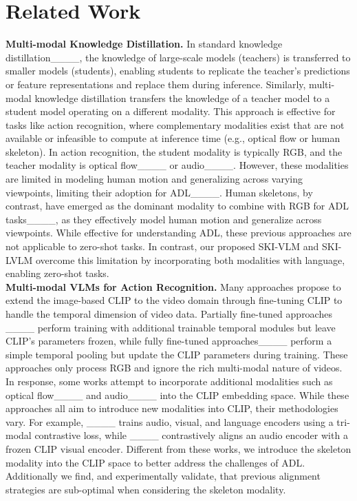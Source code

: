 \section{Related Work}
\noindent
\textbf{Multi-modal Knowledge Distillation.}
In standard knowledge distillation____, the knowledge of large-scale models (teachers) is transferred to smaller models (students), enabling students to replicate the teacher’s predictions or feature representations and replace them during inference. Similarly, multi-modal knowledge distillation transfers the knowledge of a teacher model to a student model operating on a different modality. This approach is effective for tasks like action recognition, where complementary modalities exist that are not available or infeasible to compute at inference time (e.g., optical flow or human skeleton). In action recognition, the student modality is typically RGB, and the teacher modality is optical flow____ or audio____. However, these modalities are limited in modeling human motion and generalizing across varying viewpoints, limiting their adoption for ADL____. Human skeletons, by contrast, have emerged as the dominant modality to combine with RGB for ADL tasks____, as they effectively model human motion and generalize across viewpoints. While effective for understanding ADL, these previous approaches are not applicable to zero-shot tasks. In contrast, our proposed SKI-VLM and SKI-LVLM overcome this limitation by incorporating both modalities with language, enabling zero-shot tasks.\\
\textbf{Multi-modal VLMs for Action Recognition.}
Many approaches propose to extend the image-based CLIP to the video domain through fine-tuning CLIP to handle the temporal dimension of video data. Partially fine-tuned approaches
____
perform training with additional trainable temporal modules but leave CLIP's parameters frozen, while fully fine-tuned approaches____ perform a simple temporal pooling but update the CLIP parameters during training. These approaches only process RGB and ignore the rich multi-modal nature of videos. In response, some works attempt to incorporate additional modalities such as optical flow____ and audio____ into the CLIP embedding space. While these approaches all aim to introduce new modalities into CLIP, their methodologies vary. For example, ____ trains audio, visual, and language encoders using a tri-modal contrastive loss, while ____ contrastively aligns an audio encoder with a frozen CLIP visual encoder. Different from these works, we introduce the skeleton modality into the CLIP space to better address the challenges of ADL. Additionally we find, and experimentally validate, that previous alignment strategies are sub-optimal when considering the skeleton modality.

